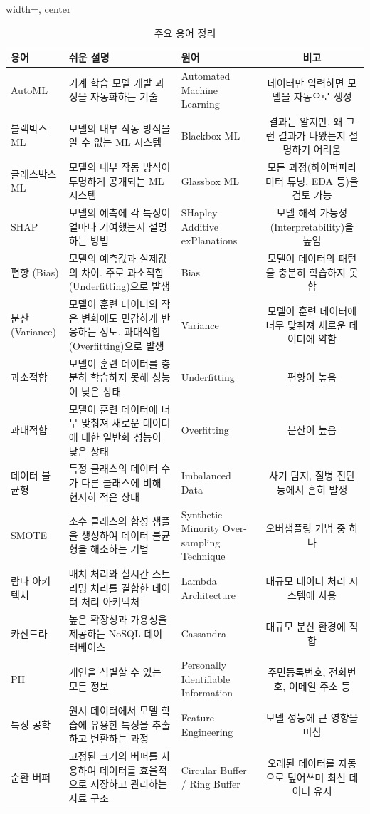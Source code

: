 \documentclass[11pt,a4paper]{article}
\theoremstyle{definition}
\begin{document}
\begin{table}[h!]
\centering
\caption{주요 용어 정리}
\label{tab:glossary}
\begin{adjustbox}{width=\textwidth, center} %
\begin{tabular}{lllc}
\toprule
\textbf{용어} & \textbf{쉬운 설명} & \textbf{원어} & \textbf{비고} \\
\midrule
AutoML & 기계 학습 모델 개발 과정을 자동화하는 기술 & Automated Machine Learning & 데이터만 입력하면 모델을 자동으로 생성 \\
블랙박스 ML & 모델의 내부 작동 방식을 알 수 없는 ML 시스템 & Blackbox ML & 결과는 알지만, 왜 그런 결과가 나왔는지 설명하기 어려움 \\
글래스박스 ML & 모델의 내부 작동 방식이 투명하게 공개되는 ML 시스템 & Glassbox ML & 모든 과정(하이퍼파라미터 튜닝, EDA 등)을 검토 가능 \\
SHAP & 모델의 예측에 각 특징이 얼마나 기여했는지 설명하는 방법 & SHapley Additive exPlanations & 모델 해석 가능성(Interpretability)을 높임 \\
편향 (Bias) & 모델의 예측값과 실제값의 차이. 주로 과소적합(Underfitting)으로 발생 & Bias & 모델이 데이터의 패턴을 충분히 학습하지 못함 \\
분산 (Variance) & 모델이 훈련 데이터의 작은 변화에도 민감하게 반응하는 정도. 과대적합(Overfitting)으로 발생 & Variance & 모델이 훈련 데이터에 너무 맞춰져 새로운 데이터에 약함 \\
과소적합 & 모델이 훈련 데이터를 충분히 학습하지 못해 성능이 낮은 상태 & Underfitting & 편향이 높음 \\
과대적합 & 모델이 훈련 데이터에 너무 맞춰져 새로운 데이터에 대한 일반화 성능이 낮은 상태 & Overfitting & 분산이 높음 \\
데이터 불균형 & 특정 클래스의 데이터 수가 다른 클래스에 비해 현저히 적은 상태 & Imbalanced Data & 사기 탐지, 질병 진단 등에서 흔히 발생 \\
SMOTE & 소수 클래스의 합성 샘플을 생성하여 데이터 불균형을 해소하는 기법 & Synthetic Minority Over-sampling Technique & 오버샘플링 기법 중 하나 \\
람다 아키텍처 & 배치 처리와 실시간 스트리밍 처리를 결합한 데이터 처리 아키텍처 & Lambda Architecture & 대규모 데이터 처리 시스템에 사용 \\
카산드라 & 높은 확장성과 가용성을 제공하는 NoSQL 데이터베이스 & Cassandra & 대규모 분산 환경에 적합 \\
PII & 개인을 식별할 수 있는 모든 정보 & Personally Identifiable Information & 주민등록번호, 전화번호, 이메일 주소 등 \\
특징 공학 & 원시 데이터에서 모델 학습에 유용한 특징을 추출하고 변환하는 과정 & Feature Engineering & 모델 성능에 큰 영향을 미침 \\
순환 버퍼 & 고정된 크기의 버퍼를 사용하여 데이터를 효율적으로 저장하고 관리하는 자료 구조 & Circular Buffer / Ring Buffer & 오래된 데이터를 자동으로 덮어쓰며 최신 데이터 유지 \\
\bottomrule
\end{tabular}
\end{adjustbox}
\end{table}
\end{document}
